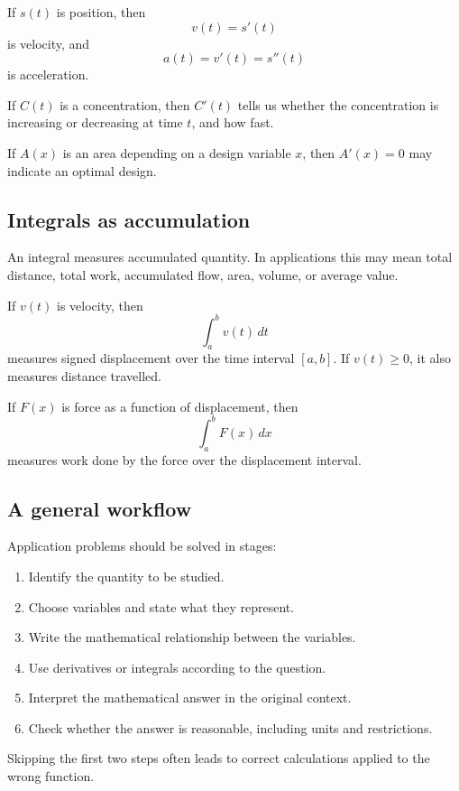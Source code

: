 If \(s(t)\) is position, then
\[
v(t)=s'(t)
\]
is velocity, and
\[
a(t)=v'(t)=s''(t)
\]
is acceleration.

If \(C(t)\) is a concentration, then \(C'(t)\) tells us whether the concentration is increasing or decreasing at time \(t\), and how fast.

If \(A(x)\) is an area depending on a design variable \(x\), then \(A'(x)=0\) may indicate an optimal design.

\subsection*{Integrals as accumulation}

An integral measures accumulated quantity. In applications this may mean total distance, total work, accumulated flow, area, volume, or average value.

If \(v(t)\) is velocity, then
\[
\int_a^b v(t)\,dt
\]
measures signed displacement over the time interval \([a,b]\). If \(v(t)\ge0\), it also measures distance travelled.

If \(F(x)\) is force as a function of displacement, then
\[
\int_a^b F(x)\,dx
\]
measures work done by the force over the displacement interval.

\subsection*{A general workflow}

Application problems should be solved in stages:

\begin{enumerate}
\item Identify the quantity to be studied.
\item Choose variables and state what they represent.
\item Write the mathematical relationship between the variables.
\item Use derivatives or integrals according to the question.
\item Interpret the mathematical answer in the original context.
\item Check whether the answer is reasonable, including units and restrictions.
\end{enumerate}

Skipping the first two steps often leads to correct calculations applied to the wrong function.

